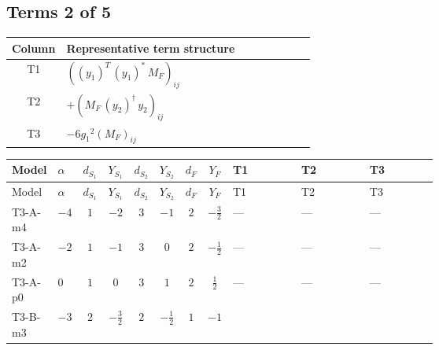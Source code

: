 \documentclass[8pt]{article}
\begin{document}
\begin{landscape}
\subsection*{Terms 2 of 5}
\begin{center}
\begin{tabular}{@{}c >{\raggedright\arraybackslash}p{0.82\linewidth}@{}}
\toprule
Column & Representative term structure \\
\midrule
T1 & \(\displaystyle \left(\left({y_1}\right)^{T}\,\left({y_1}\right)^{*}\,{M_F}\right)_{ij}\) \\
\midrule
T2 & \(\displaystyle +\left({M_F}\,\left({y_2}\right)^{\dagger}\,{y_2}\right)_{ij}\) \\
\midrule
T3 & \(\displaystyle -6 {g_1}^2 \left({M_F}\right)_{ij}\) \\
\midrule
\bottomrule
\end{tabular}
\end{center}
\smallskip
\tiny
\begin{longtable}{@{}llcccccc >{\raggedright\arraybackslash}p{0.21\linewidth} >{\raggedright\arraybackslash}p{0.21\linewidth} >{\raggedright\arraybackslash}p{0.21\linewidth}@{}}
\toprule
Model & $\alpha$ & $d_{S_1}$ & $Y_{S_1}$ & $d_{S_2}$ & $Y_{S_2}$ & $d_F$ & $Y_F$ & T1 & T2 & T3 \\
\midrule
\endfirsthead
\toprule
Model & $\alpha$ & $d_{S_1}$ & $Y_{S_1}$ & $d_{S_2}$ & $Y_{S_2}$ & $d_F$ & $Y_F$ & T1 & T2 & T3 \\
\midrule
\endhead
T3-A-m4 & $-4$ & $1$ & $-2$ & $3$ & $-1$ & $2$ & $-\frac{3}{2}$ & --- & --- & --- \\
\midrule
T3-A-m2 & $-2$ & $1$ & $-1$ & $3$ & $0$ & $2$ & $-\frac{1}{2}$ & --- & --- & --- \\
\midrule
T3-A-p0 & $0$ & $1$ & $0$ & $3$ & $1$ & $2$ & $\frac{1}{2}$ & --- & --- & --- \\
\midrule
T3-B-m3 & $-3$ & $2$ & $-\frac{3}{2}$ & $2$ & $-\frac{1}{2}$ & $1$ & $-1$ & \scriptsize\adjustbox{max width=\linewidth}{$\begin{gathered} \left(\left({y_1}\right)^{T}\,\left({y_1}\right)^{*}\,{M_F}\right)_{ij}\end{gathered}$} & \scriptsize\adjustbox{max width=\linewidth}{$\begin{gathered} +\left({M_F}\,\left({y_2}\right)^{\dagger}\,{y_2}\right)_{ij}\end{gathered}$} & \scriptsize\adjustbox{max width=\linewidth}{$\begin{gathered} -6 {g_1}^2 \left({M_F}\right)_{ij}\end{gathered}$} \\

\end{longtable}
\end{landscape}
\end{document}
